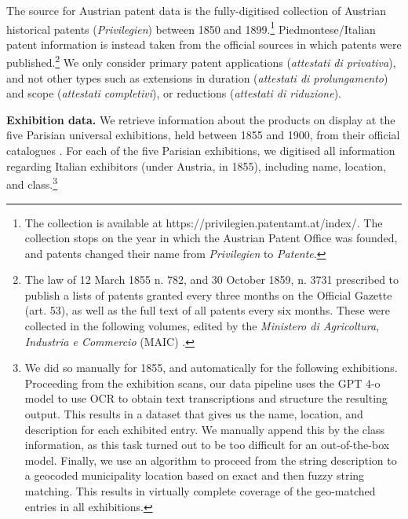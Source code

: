 The source for Austrian patent data is the fully-digitised collection of Austrian historical patents (\textit{Privilegien}) between 1850 and 1899.\footnote{The collection is available at https://privilegien.patentamt.at/index/. The collection stops on the year in which the Austrian Patent Office was founded, and patents changed their name from \textit{Privilegien} to \textit{Patente}. 
}
Piedmontese/Italian patent information is instead taken from the official sources in which patents were published.\footnote{The law of 12 March 1855 n. 782, and 30 October 1859, n. 3731 prescribed to publish a lists of patents granted every three months on the Official Gazette (art. 53), as well as the full text of all patents every six months. These were collected in the following volumes, edited by the \textit{Ministero di Agricoltura, Industria e Commercio} (MAIC) \citep{maic1855, maic1864, maic1877, maic1902}.
}
We only consider primary patent applications (\textit{attestati di privativa}), and not other types such as extensions in duration (\textit{attestati di prolungamento}) and scope (\textit{attestati completivi}), or reductions (\textit{attestati di riduzione}).    

\smallskip
\noindent \textbf{Exhibition data.} We retrieve information about the products on display at the five Parisian universal exhibitions, held between 1855 and 1900,  from their official catalogues \citep{exposition1855, exposition1867, exposition1878, exposition1889, exposition1900}.
For each of the five Parisian exhibitions, we digitised all information regarding Italian exhibitors (under Austria, in 1855), including name, location, and class.\footnote{We did so manually for 1855, and automatically for the following exhibitions. Proceeding from the exhibition scans, our data pipeline uses the GPT 4-o model \citep{openai2024url} to use OCR to obtain text transcriptions and structure the resulting output. This results in a dataset that gives us the name, location, and description for each exhibited entry. We manually append this by the class information, as this task turned out to be too difficult for an out-of-the-box model. Finally, we use an algorithm to proceed from the string description to a geocoded municipality location based on exact and then fuzzy string matching. This results in virtually complete coverage of the geo-matched entries in all exhibitions.
} 


